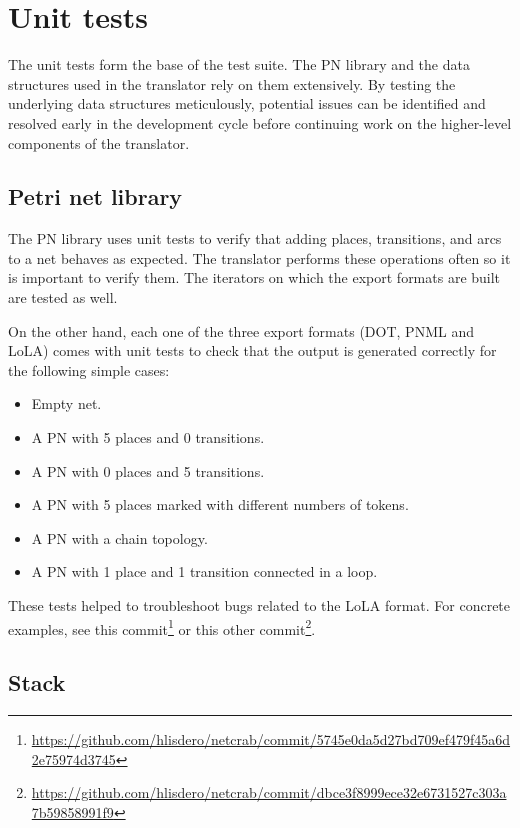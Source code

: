 \section{Unit tests}

The unit tests form the base of the test suite.
The \acrshort{PN} library and the data structures
used in the translator rely on them extensively.
By testing the underlying data structures meticulously,
potential issues can be identified and resolved early in the development cycle
before continuing work on the higher-level components of the translator.

\subsection{Petri net library}

The \acrshort{PN} library  uses unit tests to verify that
adding places, transitions, and arcs to a net behaves as expected.
The translator performs these operations often so it is important to verify them.
The iterators on which the export formats are built are tested as well.

On the other hand, each one of the three export formats
(DOT, \acrshort{PNML} and \acrshort{LoLA}) comes with unit tests
to check that the output is generated correctly for the following simple cases:

\begin{itemize}
  \item Empty net.
  \item A \acrshort{PN} with 5 places and 0 transitions.
  \item A \acrshort{PN} with 0 places and 5 transitions.
  \item A \acrshort{PN} with 5 places marked with different numbers of tokens.
  \item A \acrshort{PN} with a chain topology.
  \item A \acrshort{PN} with 1 place and 1 transition connected in a loop.
\end{itemize}

These tests helped to troubleshoot bugs related to the \acrshort{LoLA}
format.
For concrete examples,
see this commit\footnote{\url{https://github.com/hlisdero/netcrab/commit/5745e0da5d27bd709ef479f45a6d2e75974d3745}}
or this other commit\footnote{\url{https://github.com/hlisdero/netcrab/commit/dbce3f8999ece32e6731527c303a7b59858991f9}}.

\subsection{Stack}

